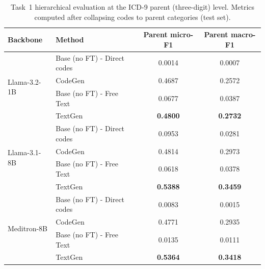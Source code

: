 \begin{table}[t]
    \centering
    \caption{Task~1 hierarchical evaluation at the ICD-9 parent (three-digit) level. Metrics computed after collapsing codes to parent categories (test set).}
    \label{tab:task1-parent-metrics}
    \begin{tabular}{llcc}
        \toprule
        \textbf{Backbone} & \textbf{Method} &
        \textbf{Parent micro-F1} &
        \textbf{Parent macro-F1} \\
        \midrule
        \multirow{4}{*}{Llama-3.2-1B} 
            & Base (no FT) - Direct codes   & 0.0014 & 0.0007 \\
            & CodeGen        & 0.4687 & 0.2572 \\
            & Base (no FT) - Free Text  & 0.0677 & 0.0387  \\
            & TextGen        & \textbf{0.4800} & \textbf{0.2732} \\
        \midrule
        \multirow{4}{*}{Llama-3.1-8B} 
            & Base (no FT) - Direct codes   & 0.0953 & 0.0281 \\
            & CodeGen        & 0.4814 & 0.2973 \\
            & Base (no FT) - Free Text  & 0.0618 & 0.0378  \\
            & TextGen        & \textbf{0.5388} & \textbf{0.3459} \\
        \midrule
        \multirow{4}{*}{Meditron-8B} 
            & Base (no FT) - Direct codes   & 0.0083 & 0.0015 \\
            & CodeGen        & 0.4771 & 0.2935 \\
            & Base (no FT) - Free Text  & 0.0135 & 0.0111  \\
            & TextGen        & \textbf{0.5364} & \textbf{0.3418} \\
        \bottomrule
    \end{tabular}
\end{table}


